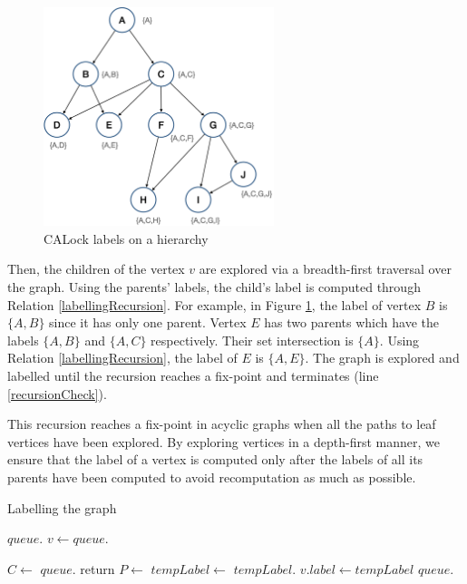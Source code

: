 \begin{figure}[h]
	\centering
	\captionsetup{justification=centering}
	\includegraphics[width=0.6\textwidth]{figures/CALockExample.png}
	\caption{CALock labels on a hierarchy}
	\label{fig:calockexample}
\end{figure}

Then, the children of the vertex $v$ are explored via a breadth-first traversal over the graph. Using the parents' labels, the child's label is computed through Relation \ref{labellingRecursion}. For example, in Figure \ref{fig:calockexample}, the label of vertex $B$ is $\{A, B\}$ since it has only one parent. Vertex $E$ has two parents which have the labels $\{A, B\}$ and $\{A, C\}$ respectively. Their set intersection is $\{A\}$. Using Relation \ref{labellingRecursion}, the label of $E$ is $\{A, E\}$. The graph is explored and labelled until the recursion reaches a fix-point and terminates (line \ref{recursionCheck}). 

This recursion reaches a fix-point in acyclic graphs when all the paths to leaf vertices have been explored. By exploring vertices in a depth-first manner, we ensure that the label of a vertex is computed only after the labels of all its parents have been computed to avoid recomputation as much as possible.


\begin{algorithm}[h]
	\caption{Labelling the graph}
	\begin{algorithmic}[1]
		\State $queue$.
		\State $v\gets queue.$
		\State {}
		\EndWhile
		\EndProcedure
		\Statex

		\State $C\gets$
		 \label{rootLabellingBegin}
		\State $queue.$
		\State return
		\EndIf\label{rootLabellingEnd}
		\State $P\gets$\label{labellingRelationImplBegin}
		\State $tempLabel\gets$\label{intersectionStart}
		\State $tempLabel$. \label{intersectionEnd}
		 \label{recursionCheck}
		\State $v.label\gets tempLabel$
		\State $queue.$
		\EndIf \label{labellingRelationImplEnd}
		\EndProcedure
	\end{algorithmic}
	\label{labelAssignment}
\end{algorithm}


